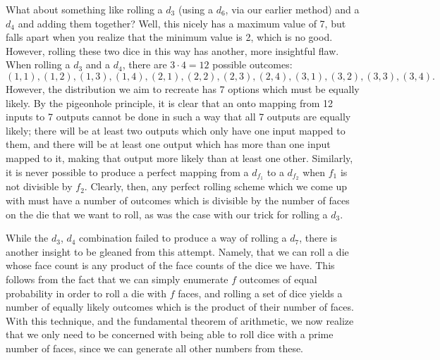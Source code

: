 \documentclass{article}
\begin{document}
\par What about something like rolling a $d_3$ (using a $d_6$, via our earlier method) and a $d_4$ and adding them together?
Well, this nicely has a maximum value of 7, but falls apart when you realize that the minimum value is 2, which is no good.
However, rolling these two dice in this way has another, more insightful flaw.
When rolling a $d_3$ and a $d_4$, there are $3 \cdot 4 = 12$ possible outcomes: $$(1, 1), (1, 2), (1, 3), (1, 4), (2, 1), (2, 2), (2, 3), (2, 4), (3, 1), (3, 2), (3, 3), (3, 4).$$
However, the distribution we aim to recreate has 7 options which must be equally likely.
By the pigeonhole principle, it is clear that an onto mapping from 12 inputs to 7 outputs cannot be done in such a way that all 7 outputs are equally likely; there will be at least two outputs which only have one input mapped to them, and there will be at least one output which has more than one input mapped to it, making that output more likely than at least one other.
Similarly, it is never possible to produce a perfect mapping from a $d_{f_1}$ to a $d_{f_2}$ when $f_1$ is not divisible by $f_2$.
Clearly, then, any perfect rolling scheme which we come up with must have a number of outcomes which is divisible by the number of faces on the die that we want to roll, as was the case with our trick for rolling a $d_3$.

\par While the $d_3$, $d_4$ combination failed to produce a way of rolling a $d_7$, there is another insight to be gleaned from this attempt.
Namely, that we can roll a die whose face count is any product of the face counts of the dice we have. 
This follows from the fact that we can simply enumerate $f$ outcomes of equal probability in order to roll a die with $f$ faces, and rolling a set of dice yields a number of equally likely outcomes which is the product of their number of faces.
With this technique, and the fundamental theorem of arithmetic, we now realize that we only need to be concerned with being able to roll dice with a prime number of faces, since we can generate all other numbers from these.
\end{document}
